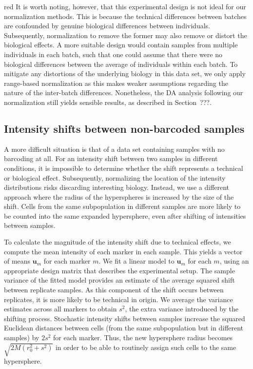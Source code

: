 \documentclass{article}
\begin{document}
\begin{color}{red}
It is worth noting, however, that this experimental design is not ideal for our normalization methods.
This is because the technical differences between batches are confounded by genuine biological differences between individuals.
Subsequently, normalization to remove the former may also remove or distort the biological effects.
A more suitable design would contain samples from multiple individuals in each batch, such that one could assume that there were no biological differences between the average of individuals within each batch.
To mitigate any distortions of the underlying biology in this data set, we only apply range-based normalization as this makes weaker assumptions regarding the nature of the inter-batch differences.
Nonetheless, the DA analysis following our normalization still yields sensible results, as described in Section~???.

\subsection{Intensity shifts between non-barcoded samples}
A more difficult situation is that of a data set containing samples with no barcoding at all.
For an intensity shift between two samples in different conditions, it is impossible to determine whether the shift represents a technical or biological effect.
Subsequently, normalizing the location of the intensity distributions risks discarding interesting biology.
Instead, we use a different approach where the radius of the hyperspheres is increased by the size of the shift.
Cells from the same subpopulation in different samples are more likely to be counted into the same expanded hypersphere, even after shifting of intensities between samples.

To calculate the magnitude of the intensity shift due to technical effects, we compute the mean intensity of each marker in each sample.
This yields a vector of means $\mathbf{u}_m$ for each marker $m$.
We fit a linear model to $\mathbf{u}_m$ for each $m$, using an appropriate design matrix that describes the experimental setup.
The sample variance of the fitted model provides an estimate of the average squared shift between replicate samples.
As this component of the shift occurs between replicates, it is more likely to be technical in origin.
We average the variance estimates across all markers to obtain $s^2$, the extra variance introduced by the shifting process.
Stochastic intensity shifts between samples increase the squared Euclidean distances between cells (from the same subpopulation but in different samples) by $2s^2$ for each marker.
Thus, the new hypersphere radius becomes $\sqrt{2M(r_0^2 + s^2)}$ in order to be able to routinely assign such cells to the same hypersphere.


\end{color}
\end{document}
